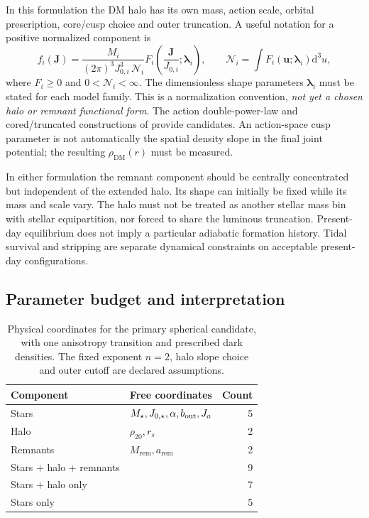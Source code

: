 \documentclass[11pt,a4paper]{article}
\newcommand{\dd}{\mathrm{d}}
\newcommand{\dm}{\mathrm{DM}}
\newcommand{\remn}{\mathrm{rem}}
\begin{document}
In this formulation the DM halo has its own mass, action scale, orbital prescription, core/cusp
choice and outer truncation. A useful notation for a positive normalized
component is
\begin{equation}
 f_i(\boldsymbol J)=\frac{M_i}{(2\pi)^3J_{0,i}^3\,\mathcal N_i}
 F_i\left(\frac{\boldsymbol J}{J_{0,i}};\boldsymbol\lambda_i\right),
 \qquad \mathcal N_i=\int F_i(\boldsymbol u;\boldsymbol\lambda_i)\dd^3u,
 \label{eq:generic}
\end{equation}
where $F_i\geq0$ and $0<\mathcal N_i<\infty$. The dimensionless shape
parameters $\boldsymbol\lambda_i$ must be stated for each model family.
This is a normalization convention, \emph{not yet a chosen halo or remnant
functional form}. The action double-power-law and cored/truncated constructions
of \citet{2015MNRAS.447.3060P,2018MNRAS.480..927P} provide candidates.
An action-space cusp parameter is not automatically the spatial density slope
in the final joint potential; the resulting $\rho_\dm(r)$ must be measured.

In either formulation the remnant component should be centrally concentrated but independent of
the extended halo. Its shape can initially be fixed while its mass and scale
vary. The halo must not be treated as another stellar mass bin with stellar
equipartition, nor forced to share the luminous truncation. Present-day
equilibrium does not imply a particular adiabatic formation history. Tidal
survival and stripping are separate dynamical constraints on acceptable
present-day configurations.

\subsection{Parameter budget and interpretation}

\begin{table}[htbp]
\centering\small
\caption{Physical coordinates for the primary spherical candidate, with one
anisotropy transition and prescribed dark densities. The fixed exponent
$n=2$, halo slope choice and outer cutoff are declared assumptions.}
\label{tab:parameters}
\begin{tabularx}{\linewidth}{lXr}
\toprule
Component & Free coordinates & Count\\
\midrule
Stars & $M_\star,J_{0,\star},\alpha,b_{\rm out},J_a$ & 5\\
Halo & $\rho_{20},r_s$ & 2\\
Remnants & $M_\remn,a_\remn$ & 2\\
\midrule
Stars + halo + remnants & & 9\\
Stars + halo only & & 7\\
Stars only & & 5\\
\bottomrule
\end{tabularx}
\end{table}
\end{document}
